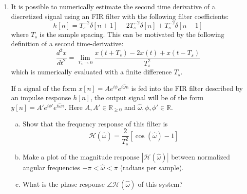 \begin{enumerate}
        \begin{marginfigure}
          \begin{center}
          \end{center}
          \caption{The impulse response of a second order derivative estimator filter with $T_s=1$.}
          \label{fig:exer_laplac}
        \end{marginfigure}

  \item It is possible to numerically estimate the second time
        derivative of a discretized signal using an FIR filter with the
        following filter coefficients:
        \begin{equation}h[n]= T_s^{-2}\delta[n+1] -2
          T_s^{-2}\delta[n] + T_s^{-2}\delta[n-1]
          \label{eq:fir_diff_filter}
        \end{equation}
        where $T_s$ is the sample spacing. This can be motivated by the 
        following definition of a second time-derivative:
        \begin{equation}
          \frac{d^2x}{dt^2} = \lim_{T_s \rightarrow 0} \frac{x(t+T_s)-2x(t)+x(t-T_s)}{T_s^2}
        \end{equation}
        which is numerically evaluated with a finite difference $T_s$.

        If a signal of the form $x[n]=A e^{i\phi}e^{i\hat{\omega} n }$ is fed into 
        the FIR filter described by an impulse response $h[n]$,
        the output signal will be of the form $y[n]=A' e^{i \phi'} e^{i \hat{\omega}n}$.
        Here $A,A'\in \mathbb{R}_{\ge 0}$ and $\hat{\omega},\phi,\phi' \in \mathbb{R}$.


        \begin{enumerate}[a)]
          \item Show that the frequency response of this filter is
                \begin{equation}
                  \mathcal{H}(\hat{\omega}) = \frac{2}{T_s^{2}}[\cos(\hat{\omega})-1]
                \end{equation}
          \item Make a plot of the magnitude response $|\mathcal{H}(\hat{\omega})|$ between 
                normalized angular frequencies $-\pi < \hat{\omega} < \pi$ (radians per sample).
          \item What is the phase response $\angle \mathcal{H}(\hat{\omega})$ of this system?


\end{enumerate}
\end{enumerate}
